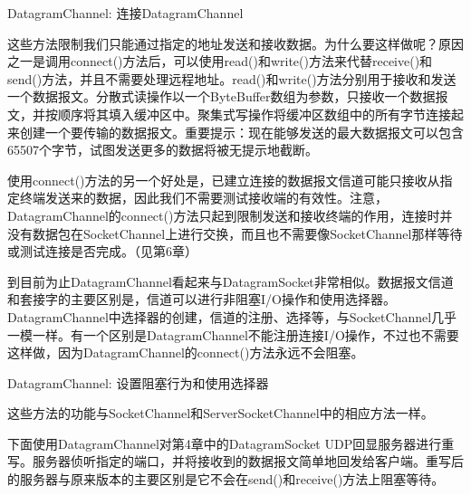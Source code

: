	DatagramChannel: 连接DatagramChannel

	

	这些方法限制我们只能通过指定的地址发送和接收数据。为什么要这样做呢？原因之一是调用connect()方法后，可以使用read()和write()方法来代替receive()和send()方法，并且不需要处理远程地址。read()和write()方法分别用于接收和发送一个数据报文。分散式读操作以一个ByteBuffer数组为参数，只接收一个数据报文，并按顺序将其填入缓冲区中。聚集式写操作将缓冲区数组中的所有字节连接起来创建一个要传输的数据报文。重要提示：现在能够发送的最大数据报文可以包含65507个字节，试图发送更多的数据将被无提示地截断。

	使用connect()方法的另一个好处是，已建立连接的数据报文信道可能只接收从指定终端发送来的数据，因此我们不需要测试接收端的有效性。注意，DatagramChannel的connect()方法只起到限制发送和接收终端的作用，连接时并没有数据包在SocketChannel上进行交换，而且也不需要像SocketChannel那样等待或测试连接是否完成。（见第6章）

	到目前为止DatagramChannel看起来与DatagramSocket非常相似。数据报文信道和套接字的主要区别是，信道可以进行非阻塞I/O操作和使用选择器。DatagramChannel中选择器的创建，信道的注册、选择等，与SocketChannel几乎一模一样。有一个区别是DatagramChannel不能注册连接I/O操作，不过也不需要这样做，因为DatagramChannel的connect()方法永远不会阻塞。

	DatagramChannel: 设置阻塞行为和使用选择器

	

	这些方法的功能与SocketChannel和ServerSocketChannel中的相应方法一样。

	下面使用DatagramChannel对第4章中的DatagramSocket UDP回显服务器进行重写。服务器侦听指定的端口，并将接收到的数据报文简单地回发给客户端。重写后的服务器与原来版本的主要区别是它不会在send()和receive()方法上阻塞等待。

	
